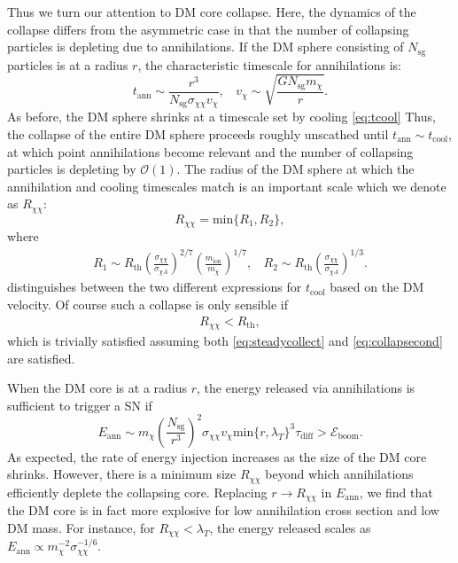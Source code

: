 \documentclass[preprintnumbers,amsmath,amssymb,prd,superscriptaddress]{revtex4}
\newcommand{\Eboom}{\mathcal{E}_\text{boom}}
\newcommand{\OO}{\mathcal{O}}
\def\r{\right)}
\def\l{\left(}
\begin{document}
Thus we turn our attention to DM core collapse.
Here, the dynamics of the collapse differs from the asymmetric case in that the number of collapsing particles is depleting due to annihilations. 
If the DM sphere consisting of $N_\text{sg}$ particles is at a radius $r$, the characteristic timescale for annihilations is:
\begin{equation}
t_\text{ann} \sim \frac{r^3}{N_\text{sg} \sigma_{\chi \chi} v_\chi}, ~~~~ v_\chi \sim \sqrt{\frac{G N_\text{sg} m_\chi}{r}}.
\end{equation}
As before, the DM sphere shrinks at a timescale set by cooling \eqref{eq:tcool} 
Thus, the collapse of the entire DM sphere proceeds roughly unscathed until $t_\text{ann} \sim t_\text{cool}$, at which point annihilations become relevant and the number of collapsing particles is depleting by $\OO(1)$.
The radius of the DM sphere at which the annihilation and cooling timescales match is an important scale which we denote as $R_{\chi \chi}$:
\begin{equation}
R_{\chi \chi} =  \text{min}\{R_1, R_2\},
\end{equation}
where 
\begin{align}
R_1 \sim R_\text{th} \l \frac{\sigma_{\chi \chi}}{\sigma_{\chi A}}\r^{2/7} \l \frac{m_\text{ion}}{m_\chi} \r^{1/7}, ~~~~ R_2 \sim R_\text{th} \l \frac{\sigma_{\chi \chi}}{\sigma_{\chi A}}\r^{1/3}. 
\end{align}
distinguishes between the two different expressions for $t_\text{cool}$ based on the DM velocity. 
Of course such a collapse is only sensible if
\begin{align}
\label{eq:xicondition}
R_{\chi \chi} < R_\text{th},
\end{align}
which is trivially satisfied assuming both \eqref{eq:steadycollect} and \eqref{eq:collapsecond} are satisfied.

When the DM core is at a radius $r$, the energy released via annihilations is sufficient to trigger a SN if
\begin{equation}
\label{eq:annburst}
E_\text{ann} \sim m_\chi \l \frac{N_\text{sg}}{r^3}\r^2 \sigma_{\chi \chi} v_\chi \text{min}\{r,\lambda_T\}^3 \tau_\text{diff} > \Eboom.
\end{equation}
As expected, the rate of energy injection increases as the size of the DM core shrinks. 
However, there is a minimum size $R_{\chi \chi}$ beyond which annihilations efficiently deplete the collapsing core.
Replacing $r \to R_{\chi \chi}$ in $E_\text{ann}$, we find that the DM core is in fact more explosive for low annihilation cross section and low DM mass. 
For instance, for $R_{\chi \chi} <\lambda_T$, the energy released scales as $E_\text{ann} \propto m_\chi^{-2} \sigma_{\chi \chi}^{-1/6}$.
\end{document}
